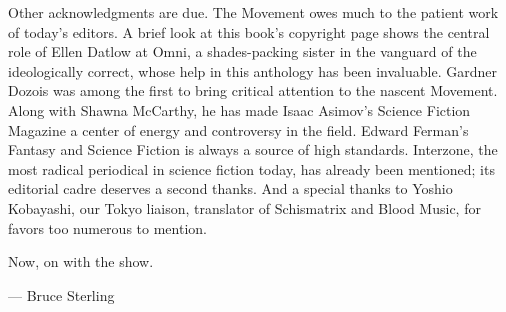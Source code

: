 Other acknowledgments are due. The Movement owes much to the patient work of today's editors. A brief look at this book's copyright page shows the central role of Ellen Datlow at Omni, a shades-packing sister in the vanguard of the ideologically correct, whose help in this anthology has been invaluable. Gardner Dozois was among the first to bring critical attention to the nascent Movement. Along with Shawna McCarthy, he has made Isaac Asimov's Science Fiction Magazine a center of energy and controversy in the field. Edward Ferman's Fantasy and Science Fiction is always a source of high standards. Interzone, the most radical periodical in science fiction today, has already been mentioned; its editorial cadre deserves a second thanks. And a special thanks to Yoshio Kobayashi, our Tokyo liaison, translator of Schismatrix and Blood Music, for favors too numerous to mention.

Now, on with the show.

--- Bruce Sterling

